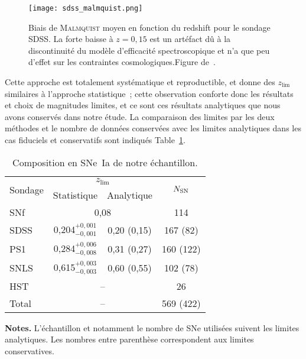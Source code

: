 \documentclass[../main/main.tex]{subfiles}
\begin{document}
\begin{SCfigure}[0.7][ht!]
    \centering
    \texttt{[image: sdss\_malmquist.png]}
    \caption[Biais de \textsc{Malmquist} moyen en fonction du redshift pour le
    sondage SDSS]{Biais de \textsc{Malmquist} moyen en fonction du redshift
        pour le sondage SDSS. La forte baisse à $z=0,15$ est un artéfact dû à la
        discontinuité du modèle d'efficacité spectroscopique et n'a que peu
        d'effet sur les contraintes cosmologiques.\smallbreak Figure
    de~\cite{conley2011}.}
    \label{fig:sdssmalm}
\end{SCfigure}

Cette approche est totalement systématique et reproductible, et donne des
$z_{\lim}$ similaires à l'approche statistique~; cette observation conforte donc
les résultats et choix de magnitudes limites, et ce sont ces résultats
analytiques que nous avons conservés dans notre étude. La comparaison des
limites par les deux méthodes et le nombre de données conservées avec les
limites analytiques dans les cas fiduciels et conservatifs sont indiqués
Table~\ref{tab:zlimsample}.

\begin{table}[ht]
    \centering
    \begin{threeparttable}
        \caption{Composition en SNe~Ia de notre échantillon.}
        \label{tab:zlimsample}
        \begin{tabular}{lccc}
            \toprule
            \multirow{2}[2]{*}{Sondage} &
            \multicolumn{2}{c}{$z_{\lim}$} &
            \multirow{2}[2]{*}{$N_{\rm SN}$}\\
            \cmidrule(lr){2-3}
            & Statistique & Analytique & \\
            \midrule
            SNf &
            \multicolumn{2}{c}{0,08} &
            114 \\
            SDSS & 
            0,204$^{+0,001}_{-0,001}$ & 0,20 (0,15) &
            167 (82) \\
            PS1 &
            0,284$^{+0,006}_{-0,008}$ & 0,31 (0,27) &
            160 (122) \\
            SNLS &
            0,615$^{+0,003}_{-0,003}$ & 0,60 (0,55) &
            102 (78) \\
            HST &
            \multicolumn{2}{c}{--} &
            26 \\
            \midrule
            Total & \multicolumn{2}{c}{--} &
            569 (422)\\
            \bottomrule
        \end{tabular}
        \begin{tablenotes}[flushleft]
        \item \textbf{\hspace{-3,2pt}Notes.} L'échantillon et notamment le
            nombre de SNe utilisées suivent les limites analytiques. Les nombres
            entre parenthèse correspondent aux limites conservatives.
        \end{tablenotes}
    \end{threeparttable}
\end{table}
\end{document}
